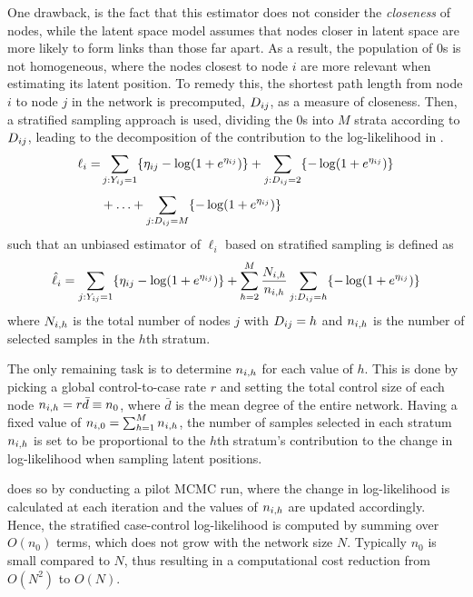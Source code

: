    One drawback, is the fact that this estimator does not consider the \emph{closeness} of nodes, while the latent space model assumes that nodes closer in latent space are more likely to form links than those far apart. As a result, the population of 0s is not homogeneous, where the nodes closest to node $i$ are more relevant when estimating its latent position. To remedy this, the shortest path length from node $i$ to node $j$ in the network is precomputed, $\sub(D)$, as a measure of closeness. Then, a stratified sampling approach is used, dividing the 0s into $M$ strata according to $\sub(D)$, leading to the decomposition of the contribution to the log-likelihood in .
    \begin{equation}
    \label{eq:case-stratified-likelihood}
        \setlength{\jot}{0.5\baselineskip}
        \begin{split}
            \ell_i = & \sum_{j:\sub(Y)=1} \{\sub(\eta)-\log(1+e^{\sub(\eta)}) \} + \sum_{j:\sub(D)=2} \{-\log(1+e^{\sub(\eta)}) \} \\
                     & + \ldots + \sum_{j:\sub(D)=M} \{-\log(1+e^{\sub(\eta)}) \}
        \end{split}
    \end{equation}
    such that an unbiased estimator of $\ell_i$ based on stratified sampling is defined as
    \begin{equation}
    \label{eq:case-stratified-estimate}
        \hat{\ell}_i = \sum_{j:\sub(Y)=1} \{\sub(\eta)-\log(1+e^{\sub(\eta)}) \} + \sum_{h=2}^M \frac{\sub(N)(i,h)}{\sub(n)(i,h)} \sum_{j:\sub(D)=h} \{-\log(1+e^{\sub(\eta)}) \}
    \end{equation}
    where $\sub(N)(i,h)$ is the total number of nodes $j$ with $\sub(D)=h$ and $\sub(n)(i,h)$ is the number of selected samples in the $h$th stratum.
    
    The only remaining task is to determine $\sub(n)(i,h)$ for each value of $h$. 
    This is done by picking a global control-to-case rate $r$ and setting the total control size of each node $\sub(n)(i,h)=r\bar{d}\equiv n_0$, where $\bar{d}$ is the mean degree of the entire network. Having a fixed value of $\sub(n)(i,0)=\sum_{h=1}^M\sub(n)(i,h)$, the number of samples selected in each stratum $\sub(n)(i,h)$ is set to be proportional to the $h$th stratum's contribution to the change in log-likelihood when sampling latent positions.
    
    \citeauthor{raftery2012fast} does so by conducting a pilot MCMC run, where the change in log-likelihood is calculated at each iteration and the values of $\sub(n)(i,h)$ are updated accordingly. Hence, the stratified case-control log-likelihood is computed by summing over $O(n_0)$ terms, which does not grow with the network size $N$. Typically $n_0$ is small compared to $N$, thus resulting in a computational cost reduction from $O(N^2)$ to $O(N)$.
    
